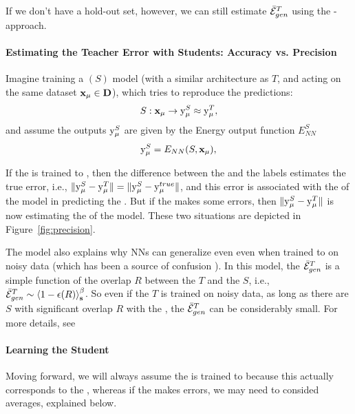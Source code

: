 If we don't have a hold-out set, however, we can still estimate $\bar{\mathcal{E}}_{gen}^{T}$ using the \Student-\Teacher approach.

\paragraph{Estimating the Teacher Error with Students: Accuracy vs. Precision}

Imagine training a \Student $(S)$  model (with a similar architecture as $T$, and acting on the same  
dataset $\mathbf{x}_{\mu}\in\mathbf{D}$), which tries to  reproduce the \Teacher predictions:
\begin{align}
S:\mathbf{x}_{\mu}\rightarrow \mathrm{y}_{\mu}^{S} \approx \mathrm{y}_{\mu}^{T}  ,
\end{align}
and assume the \Student outputs $\mathrm{y}_{\mu}^{S}$ are given by the Energy output function $E^{S}_{NN}$
\begin{align}
\label{eqn:S_ENN}
\mathrm{y}_{\mu}^{S}=E_{NN}(S,\mathbf{x}_{\mu}) ,
\end{align}

If the \Teacher is trained to \Interpolation, then the difference between
the \Student and the \Teacher labels 
estimates the true error, i.e., $\Vert\mathrm{y}_{\mu}^{S}-\mathrm{y}_{\mu}^{T}\Vert=\Vert\mathrm{y}_{\mu}^{S}-\mathrm{y}_{\mu}^{true}\Vert$,
and this error is associated with the \TrainingAccuracy of the model in predicting the \GroundTruth.
But if the \Teacher makes some errors, then $\Vert\mathrm{y}_{\mu}^{S}-\mathrm{y}_{\mu}^{T}\Vert$
is now estimating the \Precision of the model.
These two situations are depicted in Figure~\ref{fig:precision}.

The \StudentTeacher model also explains why NNs can generalize even even when trained to \Interpolation on noisy data (which has been a source of confusion \cite{Understanding16_TR}).  In this model, the \GeneralizationError  $\bar{\mathcal{E}}_{gen}^{T}$ is a simple function of the overlap $R$ between the \Teacher $T$ and the \Students $S$, i.e., $\bar{\mathcal{E}}_{gen}^{T}\sim \left\langle 1-\epsilon(R) \right\rangle_{\mathbf s}^{\beta}$.  So even if the \Teacher $T$ is trained on noisy data, as long as there are \Students $S$ with significant overlap $R$ with the \Teacher, the \Teacher \GeneralizationError  $\bar{\mathcal{E}}_{gen}^{T}$  can be considerably small.  For more details, see \cite{MM17_TR_v1}


\paragraph{Learning the Student}
Moving forward, we will always assume the \Teacher is trained to \Interpolation because this
actually corresponds to the \AnnealedApproximation, whereas if the \Teacher makes
errors, we may need to consided  \Quenched averages, explained below.

